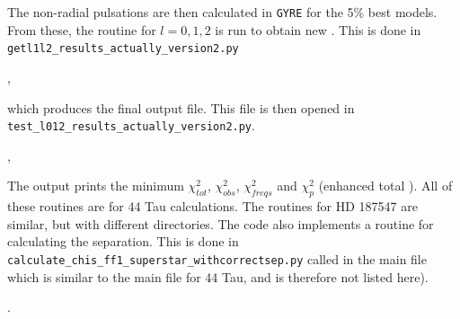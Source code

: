 The non-radial pulsations are then calculated in \texttt{GYRE} for the 5\% best models. From these, the \chis routine for $l=0,1,2$ is run to obtain new \chis. This is done in \texttt{getl1l2\_results\_actually\_version2.py}

,

\noindent which produces the final output file. This file is then opened in \texttt{test\_l012\_results\_actually\_version2.py}.

,

 The output prints the minimum  $\chi_{tot}^2$,  $\chi_{obs}^2$, $\chi_{freqs}^2$  and $\chi_{p}^2$ (enhanced total \chis). All of these routines are for 44 Tau calculations. The routines for HD 187547 are similar, but with different directories. The \chis code also implements a routine for calculating the separation. This is done in \texttt{calculate\_chis\_ff1\_superstar\_withcorrectsep.py} called in the main file which is similar to the main file for 44 Tau, and is therefore not listed here).
 
. 
 
 

